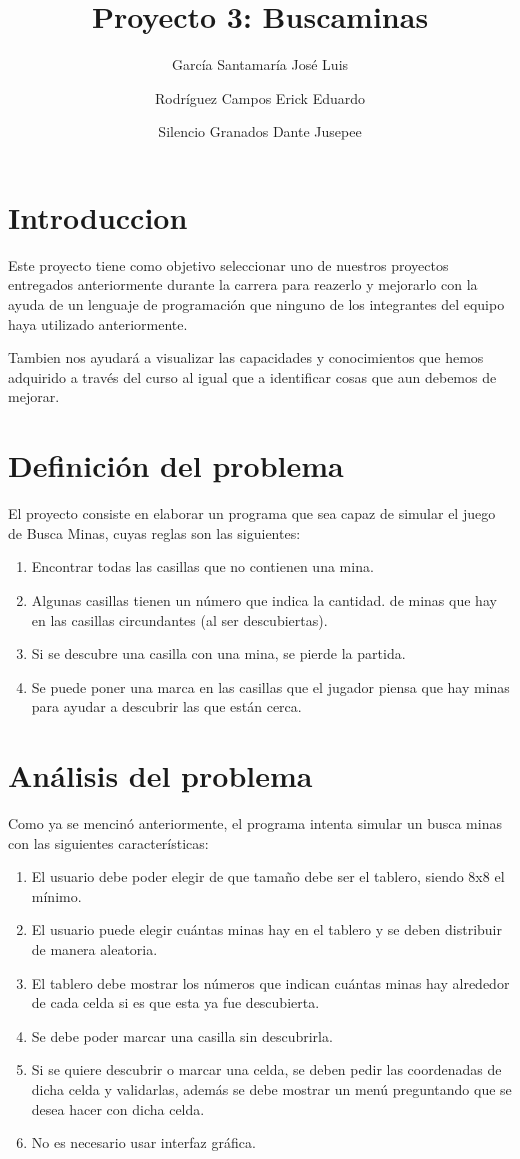\documentclass[15pt, letterpaper]{article}
\title{Proyecto 3: Buscaminas}
\author{
García Santamaría José Luis
\and
Rodríguez Campos Erick Eduardo
\and
Silencio Granados Dante Jusepee
}
\begin{document}
\maketitle

\section{Introduccion}
Este proyecto tiene como objetivo seleccionar uno de nuestros proyectos entregados anteriormente durante la carrera para reazerlo y mejorarlo con la ayuda de un lenguaje de programación que ninguno de los integrantes del equipo haya utilizado anteriormente.\newline

Tambien nos ayudará a visualizar las capacidades y conocimientos que hemos adquirido a través del curso al igual que a identificar cosas que aun debemos de mejorar.

\section{Definición del problema}
El proyecto consiste en elaborar un programa que sea capaz de  simular el juego de Busca Minas, cuyas reglas son las siguientes:

\begin{enumerate}
\item Encontrar todas las casillas que no contienen una mina.
\item Algunas casillas tienen un número que indica la cantidad. de minas que hay en las casillas circundantes (al ser descubiertas).
\item Si se descubre una casilla con una mina, se pierde la partida.
\item Se puede poner una marca en las casillas que el jugador piensa que hay minas para ayudar a descubrir las que están cerca.
\end{enumerate}


\section{Análisis del problema}
Como ya se mencinó anteriormente, el programa intenta simular un busca minas con las siguientes características:


\begin{enumerate}
\item El usuario debe poder elegir de que tamaño debe ser el tablero, siendo 8x8 el mínimo.
\item El usuario puede elegir cuántas minas hay en el tablero y se deben distribuir de manera aleatoria.
\item El tablero debe mostrar los números que indican cuántas minas hay alrededor de cada celda si es que esta ya fue descubierta.
\item Se debe poder marcar una casilla sin descubrirla.
\item Si se quiere descubrir o marcar una celda, se deben pedir las coordenadas de dicha celda y validarlas, además se debe mostrar un menú preguntando que se desea hacer con dicha celda.
\item No es necesario usar interfaz gráfica.
\end{enumerate}
\end{document}
